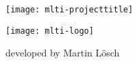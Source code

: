 \vspace*{4cm}
\begin{center}

\texttt{[image: mlti-projecttitle]}

\vspace*{1cm}

\texttt{[image: mlti-logo]}

\vspace*{2cm}

{\Large developed by Martin L\"osch}

\end{center}